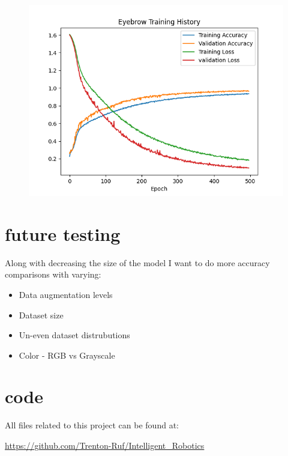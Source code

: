 \documentclass[11pt]{scrartcl} %
\begin{document}
\begin{figure}[ht!] %
	\centering
	\includegraphics[width=0.8\columnwidth]{figures/trainingGraph_RGB.png} 
	\caption{}
\end{figure}

\section{future testing}
Along with decreasing the size of the model I want to do more accuracy comparisons with varying:
\begin{itemize}
	\item Data augmentation levels
	\item Dataset size 
	\item Un-even dataset distrubutions
	\item Color - RGB vs Grayscale
\end{itemize}

\clearpage

\section{code}

All files related to this project can be found at: 

\url{https://github.com/Trenton-Ruf/Intelligent_Robotics}


\end{document}
